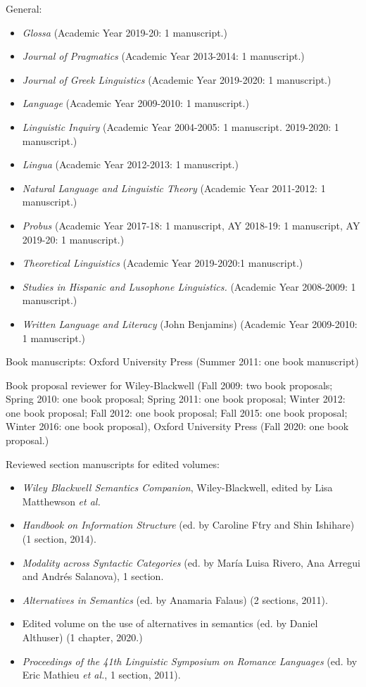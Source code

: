 \documentclass[11pt]{article}
\begin{document}
General:
\begin{itemize}
\item[] \textit{Glossa} (Academic Year 2019-20: 1 manuscript.)
\item[] \textit{Journal of Pragmatics} (Academic Year
  2013-2014: 1
  manuscript.)
  \item[] \textit{Journal of Greek Linguistics} (Academic Year
    2019-2020: 1
    manuscript.)
\item[] \textit{Language} (Academic Year  2009-2010: 1 manuscript.)
\item[] \textit{Linguistic Inquiry} (Academic Year  2004-2005: 1 manuscript. 2019-2020: 1 manuscript.)
\item[] \textit{Lingua} (Academic Year  2012-2013: 1 manuscript.)
\item[] \textit{Natural Language and Linguistic Theory} (Academic Year
  2011-2012: 1
  manuscript.)
  \item[] \textit{Probus} (Academic Year 2017-18: 1 manuscript, AY 2018-19: 1 manuscript, AY 2019-20: 1 manuscript.)
  \item[] \textit{Theoretical Linguistics} (Academic Year 2019-2020:1 manuscript.)
\item[] \textit{Studies in Hispanic and Lusophone Linguistics.} (Academic Year 
  2008-2009: 1 manuscript.)
\item[] \textit{Written Language and Literacy} (John Benjamins) (Academic Year 
  2009-2010: 1 manuscript.)
\end{itemize}


Book manuscripts: Oxford University Press
(Summer 2011: one book manuscript)

Book proposal reviewer for Wiley-Blackwell (Fall 2009: two book
proposals; Spring 2010: one book
proposal; Spring 2011: one book proposal; Winter 2012: one book
proposal; Fall 2012: one book proposal; Fall 2015: one book proposal; Winter 2016: one book proposal), Oxford University Press (Fall 2020: one book proposal.)

Reviewed section manuscripts for edited volumes: 
\begin{itemize}
\item[] \textit{Wiley Blackwell Semantics Companion}, Wiley-Blackwell, edited by Lisa Matthewson \textit{et al.}
\item[] \textit{Handbook on Information Structure} (ed. by Caroline F\'try and Shin Ishihare) (1 section, 2014).
\item[] \textit{Modality across Syntactic Categories} (ed. by Mar\'ia Luisa Rivero, Ana Arregui and Andr\'es Salanova), 1 section.
\item[] \textit{Alternatives in Semantics} (ed. by Anamaria Falaus) (2
  sections, 2011).
  \item [] Edited volume on the use of alternatives in semantics (ed. by Daniel Althuser) (1 chapter, 2020.)
\item[] \textit{Proceedings of the 41th Linguistic Symposium on
    Romance Languages} (ed. by Eric Mathieu \textit{et al.}, 1
  section, 2011).
\end{itemize}
\end{document}
